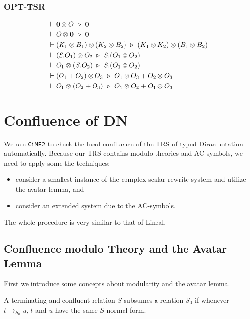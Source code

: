 \subsubsection*{\textsf{OPT-TSR}}
\begin{align*}
  & \vdash \mathbf{0} \otimes O \ \triangleright\  \mathbf{0} \\
  & \vdash O \otimes \mathbf{0} \ \triangleright\  \mathbf{0} \\
  & \vdash (K_1 \otimes B_1) \otimes (K_2 \otimes B_2) \ \triangleright\  (K_1 \otimes K_2) \otimes (B_1 \otimes B_2) \\
  & \vdash (S.O_1) \otimes O_2 \ \triangleright\  S.(O_1 \otimes O_2) \\
  & \vdash O_1 \otimes (S.O_2) \ \triangleright\  S.(O_1 \otimes O_2) \\
  & \vdash (O_1 + O_2) \otimes O_3 \ \triangleright\  O_1 \otimes O_3 + O_2 \otimes O_3 \\
  & \vdash O_1 \otimes (O_2 + O_3) \ \triangleright\  O_1 \otimes O_2 + O_1 \otimes O_3
\end{align*}


\section{Confluence of DN}

We use \texttt{CiME2} to check the local confluence of the TRS of typed Dirac notation automatically. Because our TRS contains modulo theories and AC-symbols, we need to apply some the techniques:

\begin{itemize}
  \item consider a smallest instance of the complex scalar rewrite system and utilize the avatar lemma, and
  \item consider an extended system due to the AC-symbols.
\end{itemize}

The whole procedure is very similar to that of Lineal.

\subsection{Confluence modulo Theory and the Avatar Lemma}

First we introduce some concepts about modularity and the avatar lemma.

\begin{definition}[Subsumption]
  A terminating and confluent relation $S$ subsumes a relation $S_0$ if whenever $t \to_{S_0} u$, $t$ and $u$ have the same $S$-normal form.
\end{definition}

